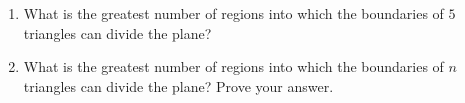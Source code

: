 \begin{enumerate}
\item[(a)] What is the greatest number of regions into which the boundaries of $5$ triangles can divide the plane?
\item[(b)] What is the greatest number of regions into which the boundaries of $n$ triangles can divide the plane? Prove your answer.
\end{enumerate}
